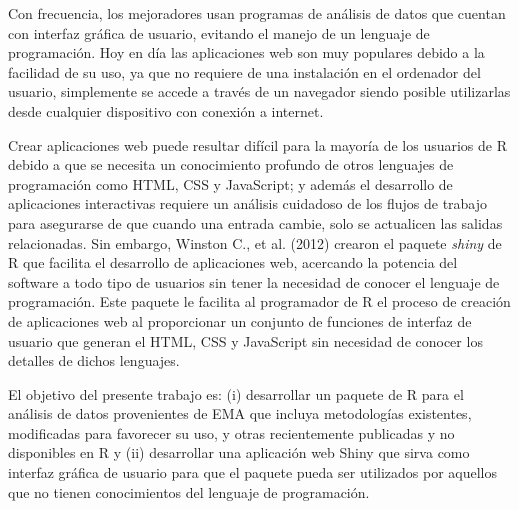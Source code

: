 Con frecuencia, los mejoradores usan programas de análisis de datos que cuentan con interfaz gráfica de usuario, evitando el manejo de un lenguaje de programación. Hoy en día las aplicaciones web son muy populares debido a la facilidad de su uso, ya que no requiere de una instalación en el ordenador del usuario, simplemente se accede a través de un navegador siendo posible utilizarlas desde cualquier dispositivo con conexión a internet.

Crear aplicaciones web puede resultar difícil para la mayoría de los usuarios de R debido a que se necesita un conocimiento profundo de otros lenguajes de programación como HTML, CSS y JavaScript; y además el desarrollo de aplicaciones interactivas requiere un análisis cuidadoso de los flujos de trabajo para asegurarse de que cuando una entrada cambie, solo se actualicen las salidas relacionadas. Sin embargo,  Winston C., et al. (2012) crearon el paquete \emph{shiny} de R que facilita el desarrollo de aplicaciones web, acercando la potencia del software a todo tipo de usuarios sin tener la necesidad de conocer el lenguaje de programación. Este paquete le facilita al programador de R el proceso de creación de 
aplicaciones web al proporcionar un conjunto de funciones de interfaz de usuario que generan el HTML, CSS y JavaScript sin necesidad de conocer los detalles de dichos lenguajes. 



El objetivo del presente trabajo es: (i) desarrollar un paquete de R para el análisis de datos provenientes de EMA que incluya metodologías existentes, modificadas para favorecer su uso, y otras recientemente publicadas y no disponibles en R y (ii) desarrollar una aplicación web Shiny que sirva como interfaz gráfica de usuario para que el paquete pueda ser utilizados por aquellos que no tienen conocimientos del lenguaje de programación.
